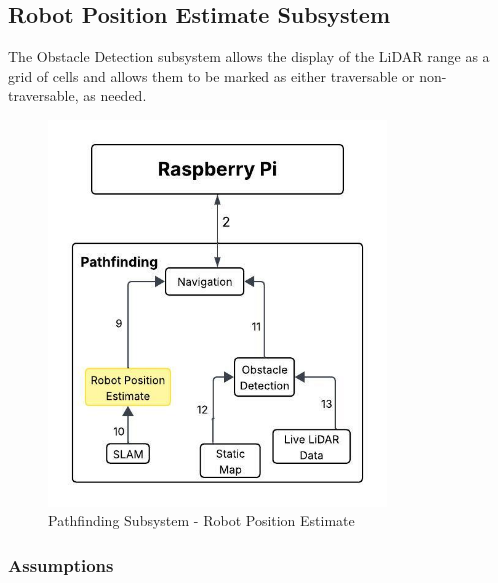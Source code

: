 \newpage
\subsection{Robot Position Estimate Subsystem}
The Obstacle Detection subsystem allows the display of the LiDAR range as a grid of cells and allows them to be marked as either traversable or non-traversable, as needed.



\begin{figure}[h!]
	\centering
 	\includegraphics[width=0.80\textwidth]{images/pathfinding 2/Data_Flow_RobotPosition.jpeg}
 \caption{Pathfinding Subsystem - Robot Position Estimate} %
\end{figure}

\subsubsection{Assumptions}

